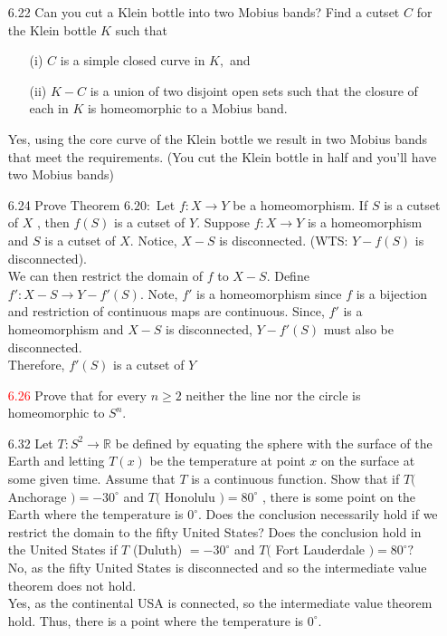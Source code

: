 \documentclass[12pt]{article}
\begin{document}
\begin{enumerate}
		\item[6.22] Can you cut a Klein bottle into two Mobius bands? Find a cutset $C$ for the
		Klein bottle $K$ such that
		 \begin{enumerate}
		 	\item[(i)]  $C$ is a simple closed curve in $K ,$ and
		 	\item[(ii)] $K - C$ is a union of two disjoint open sets such that the closure of
		 	each in $K$ is homeomorphic to a Mobius band.
		 \end{enumerate}
	 	Yes, using the core curve of the Klein bottle we result in two Mobius bands that meet the requirements. (You cut the Klein bottle in half and you'll have two Mobius bands)
		\item[6.24] Prove Theorem $6.20 :$ Let $f : X \rightarrow Y$ be a homeomorphism. If $S$ is a cutset of $X$ , then $f ( S )$ is a cutset of $Y .$
			Suppose $ f: X \rightarrow Y $ is a homeomorphism and $ S $ is a cutset of $X$. Notice, $ X-S $ is disconnected. (WTS: $ Y-f(S) $ is disconnected).\\
			 We can then restrict the domain of $ f $ to $ X-S $. Define $ f':X-S \rightarrow Y-f'(S) $. Note, $ f' $ is a homeomorphism since $ f $ is a bijection and restriction of continuous maps are continuous. Since, $ f' $ is a homeomorphism and $ X-S $ is disconnected, $ Y-f'(S) $ must also be disconnected.\\
			 Therefore, $ f'(S) $ is a cutset of $ Y $
		\item[\textcolor{red}{6.26}] Prove that for every $n \geq 2$ neither the line nor the circle is homeomorphic to	$S ^ { n } .$
		
		\item[6.32] Let $T : S ^ { 2 } \rightarrow \mathbb { R }$ be defined by equating the sphere with the surface of the Earth
		and letting $T ( x )$ be the temperature at point $x$ on the surface at some given time.
		Assume that $T$ is a continuous function. Show that if $T ($ Anchorage $) = - 30 ^ { \circ }$ and $T ($ Honolulu $) = 80 ^ { \circ }$ , there is some point on the Earth where the temperature	is $0 ^ { \circ } .$ Does the conclusion necessarily hold if we restrict the domain to the fifty United States? Does the conclusion hold in the United States if $T$ (Duluth) $=- 30 ^ { \circ }$ and $T ($ Fort Lauderdale $) = 80 ^ { \circ } ?$\\
		
		No, as the fifty United States is disconnected and so the intermediate value theorem does not hold.\\
		Yes, as the continental USA is connected, so the intermediate value theorem hold. Thus, there is a point where the temperature is $ 0^\circ $. 
		

\end{enumerate}
\end{document}

